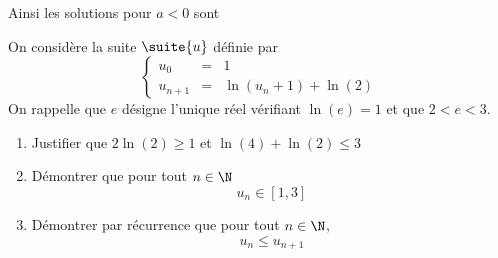 \documentclass[a4paper, 11pt,reqno]{article}
\begin{document}
\begin{correction}
\begin{enumerate}
 
  Ainsi les solutions pour $a<0$ sont 
 \conclusion{ $S_a =]4a,2a[ \cup [a,-2a]$}
 
\end{enumerate}
\end{correction}


\begin{exercice}

On considère la suite $\suite{u}$ définie par 
$$\left\{ \begin{array}{ccl}
u_0 & = & 1\\
u_{n+1} &=& \ln(u_n+1) +\ln(2) 
\end{array}\right.$$
On rappelle que $e$ désigne l'unique réel vérifiant $\ln(e) =1$ et que $2<e<3$.
\begin{enumerate}
\item Justifier que $2\ln(2)\geq 1$ et $\ln(4)+\ln(2)\leq 3$
\item Démontrer que pour tout $n\in \N$ 
$$u_n\in [1,3]$$
\item  Démontrer par récurrence que pour tout $n\in \N$, $$u_n\leq u_{n+1}$$

\end{enumerate}

\end{exercice}
\end{document}
